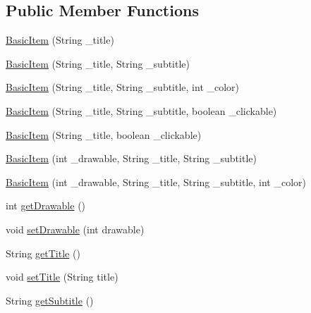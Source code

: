 \subsection*{Public Member Functions}
\begin{DoxyCompactItemize}
\item 
\hyperlink{classcom_1_1zia_1_1freshdocs_1_1model_1_1_basic_item_a62a8272c02ffd6c3f12b3e17ac5ad51f}{Basic\-Item} (String \-\_\-title)
\item 
\hyperlink{classcom_1_1zia_1_1freshdocs_1_1model_1_1_basic_item_a6ab15af9af79134aeebffe09479c236a}{Basic\-Item} (String \-\_\-title, String \-\_\-subtitle)
\item 
\hyperlink{classcom_1_1zia_1_1freshdocs_1_1model_1_1_basic_item_a4f7b9eaa60d24a39bc73492979e79dbf}{Basic\-Item} (String \-\_\-title, String \-\_\-subtitle, int \-\_\-color)
\item 
\hyperlink{classcom_1_1zia_1_1freshdocs_1_1model_1_1_basic_item_a6b0ce712add7ca850b77f7f2082ab28a}{Basic\-Item} (String \-\_\-title, String \-\_\-subtitle, boolean \-\_\-clickable)
\item 
\hyperlink{classcom_1_1zia_1_1freshdocs_1_1model_1_1_basic_item_a1f33d38c5d08693686b5978b7266ed5d}{Basic\-Item} (String \-\_\-title, boolean \-\_\-clickable)
\item 
\hyperlink{classcom_1_1zia_1_1freshdocs_1_1model_1_1_basic_item_a2342c7237085f859751e0f9819bfb9b1}{Basic\-Item} (int \-\_\-drawable, String \-\_\-title, String \-\_\-subtitle)
\item 
\hyperlink{classcom_1_1zia_1_1freshdocs_1_1model_1_1_basic_item_ab02d8b2c72188bf4e9587eb2a7251a65}{Basic\-Item} (int \-\_\-drawable, String \-\_\-title, String \-\_\-subtitle, int \-\_\-color)
\item 
int \hyperlink{classcom_1_1zia_1_1freshdocs_1_1model_1_1_basic_item_a586f5a7cf533c76d1e0cb352cfba751f}{get\-Drawable} ()
\item 
void \hyperlink{classcom_1_1zia_1_1freshdocs_1_1model_1_1_basic_item_a0f4b02782af81b941dccdc829b8452de}{set\-Drawable} (int drawable)
\item 
String \hyperlink{classcom_1_1zia_1_1freshdocs_1_1model_1_1_basic_item_a8a5ea6eea3865c6fdee25abd9fef820b}{get\-Title} ()
\item 
void \hyperlink{classcom_1_1zia_1_1freshdocs_1_1model_1_1_basic_item_ab39bcaa46042238bfd30c3041392ff1c}{set\-Title} (String title)
\item 
String \hyperlink{classcom_1_1zia_1_1freshdocs_1_1model_1_1_basic_item_a41d2d5167e783f7c80acb4f8d582309c}{get\-Subtitle} ()

\end{DoxyCompactItemize}
